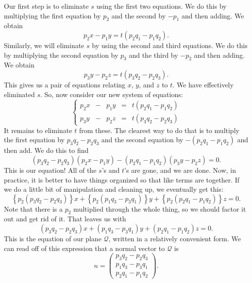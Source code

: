 \documentclass[00-livre-main.tex]{subfiles}
\begin{document}
Our first step is to eliminate $s$ using the first two equations. We do this by multiplying the first equation by $p_2$ and the second by $-p_1$ and then adding.
We obtain
\[
p_2 x - p_1 y = t (p_2q_1 - p_1 q_2).
\]
Similarly, we will eliminate $s$ by using the second and third equations. We do this by multiplying the second equation by $p_3$ and the third by $-p_2$ and then adding. We obtain
\[
p_3 y - p_2 z = t (p_3 q_2 - p_2 q_3).
\]
This gives us a pair of equations relating $x$, $y$, and $z$ to $t$. We have effectively eliminated $s$. So, now consider our new system of equations:
\[
\left\{ \begin{array}{rrrrr}
p_2 x &-& p_1 y &=& t (p_2q_1 - p_1 q_2) \\
p_3 y &-& p_2 z &=& t (p_3 q_2 - p_2 q_3)
\end{array}\right.
\]
It remains to eliminate $t$ from these. The clearest way to do that is to multiply the first equation by $p_3q_2-p_2q_3$ and the second equation by $-(p_2q_1 - p_1 q_2)$ and then add. We do this to find
\[
(p_3 q_2 - p_2 q_3)(p_2 x - p_1 y) -(p_2q_1 - p_1 q_2)(p_3 y - p_2 z) = 0.
\]
This is our equation! All of the $s$'s and $t$'s are gone, and we are done.
Now, in practice, it is better to have things organized so that like terms are together. If we do a little bit of manipulation and cleaning up, we eventually get this:
\[
\left\{p_2(p_3 q_2 - p_2 q_3)\right\} x +
\left\{p_2(p_1 q_3 - p_3 q_1)\right\} y +
\left\{p_2(p_2 q_1 - p_1 q_2)\right\} z = 0.
\]
Note that there is a $p_2$ multiplied through the whole thing, so we should factor it out and get rid of it. That leaves us with
\[
(p_3 q_2 - p_2 q_3) x +
(p_1 q_3 - p_3 q_1) y +
(p_2 q_1 - p_1 q_2) z = 0.
\]
This is the equation of our plane $\mathcal{Q}$, written in a relatively convenient form.
We can read off of this expression that a normal vector to $\mathcal{Q}$ is 
\[
n = \begin{pmatrix} p_3 q_2 - p_2 q_3 \\
p_1 q_3 - p_3 q_1 \\ p_2 q_1 - p_1 q_2 \end{pmatrix}.
\]
\end{document}
